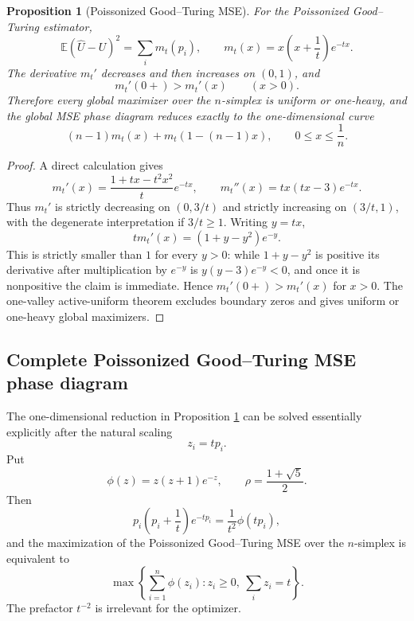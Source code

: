\documentclass[11pt]{article}
\newtheorem{proposition}[theorem]{Proposition}
\theoremstyle{definition}
\newcommand{\E}{\mathbb E}
\begin{document}
\begin{proposition}[Poissonized Good--Turing MSE]\label{prop:poissonized-good-turing-mse}
For the Poissonized Good--Turing estimator,
\[
  \E(\widehat U-U)^2=\sum_i m_t(p_i),
  \qquad
  m_t(x)=x\left(x+\frac1t\right)e^{-t x}.
\]
The derivative $m_t'$ decreases and then increases on $(0,1)$, and
\[
  m_t'(0+)>m_t'(x)\qquad(x>0).
\]
Therefore every global maximizer over the $n$-simplex is uniform or one-heavy, and the global MSE phase diagram reduces exactly to the one-dimensional curve
\[
  (n-1)m_t(x)+m_t(1-(n-1)x),
  \qquad 0\le x\le \frac1n.
\]
\end{proposition}

\begin{proof}
A direct calculation gives
\[
  m_t'(x)=\frac{1+t x-t^2x^2}{t}e^{-t x},
  \qquad
  m_t''(x)=t x(t x-3)e^{-t x}.
\]
Thus $m_t'$ is strictly decreasing on $(0,3/t)$ and strictly increasing on $(3/t,1)$, with the degenerate interpretation if $3/t\ge1$.  Writing $y=t x$,
\[
  t m_t'(x)=(1+y-y^2)e^{-y}.
\]
This is strictly smaller than $1$ for every $y>0$: while $1+y-y^2$ is positive its derivative after multiplication by $e^{-y}$ is $y(y-3)e^{-y}<0$, and once it is nonpositive the claim is immediate.  Hence $m_t'(0+)>m_t'(x)$ for $x>0$.  The one-valley active-uniform theorem excludes boundary zeros and gives uniform or one-heavy global maximizers.
\end{proof}



\subsection{Complete Poissonized Good--Turing MSE phase diagram}\label{subsec:gt-mse-complete}

The one-dimensional reduction in Proposition \ref{prop:poissonized-good-turing-mse} can be solved essentially explicitly after the natural scaling
\[
  z_i=t p_i .
\]
Put
\[
  \phi(z)=z(z+1)e^{-z},
  \qquad
  \rho=\frac{1+\sqrt5}{2}.
\]
Then
\[
  p_i\left(p_i+\frac1t\right)e^{-t p_i}
  =\frac1{t^2}\phi(t p_i),
\]
and the maximization of the Poissonized Good--Turing MSE over the $n$-simplex is equivalent to
\[
  \max\left\{\sum_{i=1}^n \phi(z_i): z_i\ge0,\ \sum_i z_i=t\right\}.
\]
The prefactor $t^{-2}$ is irrelevant for the optimizer.
\end{document}
